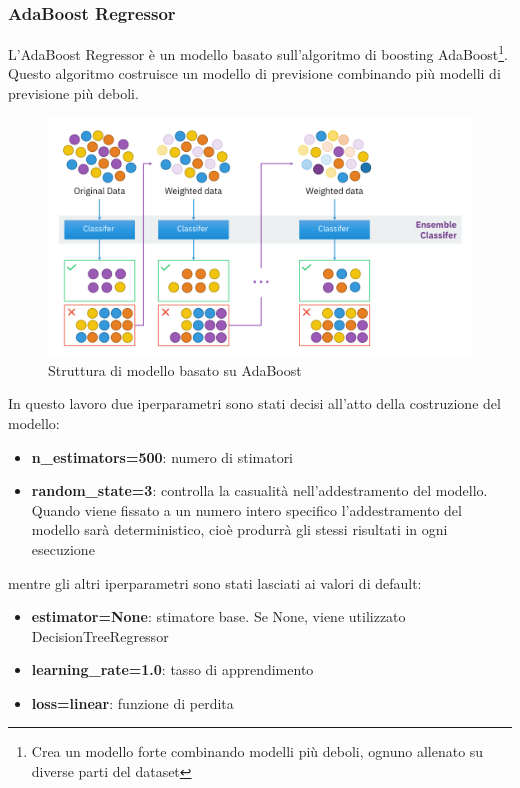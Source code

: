 \subsubsection{AdaBoost Regressor}
L'AdaBoost Regressor è un modello basato sull'algoritmo di boosting AdaBoost\footnote{Crea un modello forte combinando modelli più deboli, ognuno allenato su diverse parti del dataset}{}. Questo algoritmo costruisce un modello di previsione combinando più modelli di previsione più deboli.
\begin{figure}[H]
    \centering
    \includegraphics[scale=0.4]{images/AdaBoost.png}
    \caption{Struttura di modello basato su AdaBoost}
\end{figure}

\noindent In questo lavoro due iperparametri sono stati decisi all'atto della costruzione del modello:

\begin{itemize}
    \item \textbf{n\_estimators=500}: numero di stimatori
    \item \textbf{random\_state=3}:  controlla la casualità nell'addestramento del modello. Quando viene fissato a un numero intero specifico l'addestramento del modello sarà deterministico, cioè produrrà gli stessi risultati in ogni esecuzione
\end{itemize}

\noindent mentre gli altri iperparametri sono stati lasciati ai valori di default:
\begin{itemize}
    \item \textbf{estimator=None}: stimatore base. Se None, viene utilizzato DecisionTreeRegressor
    \item \textbf{learning\_rate=1.0}: tasso di apprendimento
    \item \textbf{loss=linear}: funzione di perdita
\end{itemize}

